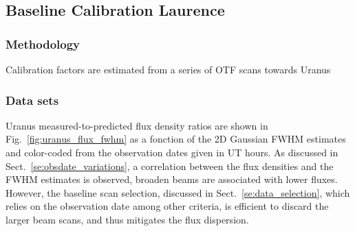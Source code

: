 \subsection{Baseline Calibration {\color{blue} Laurence} }

\subsubsection{Methodology}
Calibration factors are estimated from a series of OTF scans towards Uranus

\subsubsection{Data sets}


Uranus measured-to-predicted flux density ratios are shown in Fig.~\ref{fig:uranus_flux_fwhm} as a fonction of the 2D Gaussian FWHM estimates and color-coded from the observation dates given in UT hours. As discussed in Sect.~\ref{se:obsdate_variations}, a correlation between the flux densities and the FWHM estimates is observed, broaden beams are associated with lower fluxes. However, the baseline scan selection, discussed in Sect.~\ref{se:data_selection}, which relies on the observation date among other criteria, is efficient to discard the larger beam scans, and thus mitigates the flux dispersion.          



